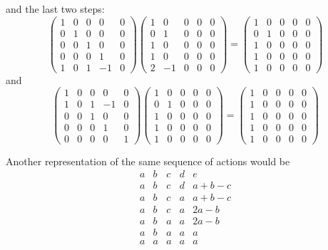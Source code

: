 \documentclass[a4paper,12pt]{article}
\begin{document}
and the last two steps:
\[
\begin{pmatrix}
1&0&0&0&0\\
0&1&0&0&0\\
0&0&1&0&0\\
0&0&0&1&0\\
1&0&1&-1&0
\end{pmatrix}
\begin{pmatrix}
 1&0&0&0&0\\
 0&1&0&0&0\\
 1&0&0&0&0\\
 1&0&0&0&0\\
 2&-1&0&0&0 
\end{pmatrix}
=
\begin{pmatrix}
1&0&0&0&0\\
0&1&0&0&0\\
1&0&0&0&0\\
1&0&0&0&0\\
1&0&0&0&0
\end{pmatrix}
\]
and
\[
\begin{pmatrix}
 1&0&0&0&0\\
 1&0&1&-1&0\\
 0&0&1&0&0\\
 0&0&0&1&0\\
 0&0&0&0&1 
\end{pmatrix}
\begin{pmatrix}
1&0&0&0&0\\
0&1&0&0&0\\
1&0&0&0&0\\
1&0&0&0&0\\
1&0&0&0&0
\end{pmatrix}
=
\begin{pmatrix}
1&0&0&0&0\\
1&0&0&0&0\\
1&0&0&0&0\\
1&0&0&0&0\\
1&0&0&0&0
\end{pmatrix}
\]

Another representation of the same sequence of actions would be
\[
\begin{matrix}
    a&b&c&d&e\\
    a&b&c&d&a+b-c\\
    a&b&c&a&a+b-c\\
    a&b&c&a&2a-b\\
    a&b&a&a&2a-b\\
    a&b&a&a&a\\
    a&a&a&a&a
\end{matrix}
\]
\end{document}
